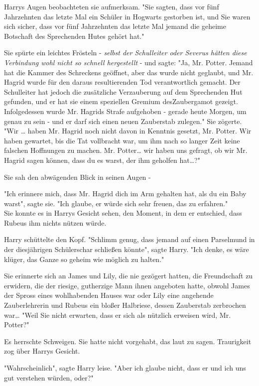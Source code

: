 {Harrys Augen beobachteten sie aufmerksam. "Sie sagten, dass vor fünf Jahrzehnten das letzte Mal ein Schüler in Hogwarts gestorben ist, und Sie waren sich sicher, dass vor fünf Jahrzehnten das letzte Mal jemand die geheime Botschaft des Sprechenden Hutes gehört hat."

Sie spürte ein leichtes Frösteln - \emph{selbst der Schulleiter oder Severus hätten diese Verbindung wohl nicht so schnell hergestellt} - und sagte: "Ja, Mr. Potter. Jemand hat die Kammer des Schreckens geöffnet, aber das wurde nicht geglaubt, und Mr. Hagrid wurde für den daraus resultierenden Tod verantwortlich gemacht. Der Schulleiter hat jedoch die zusätzliche Verzauberung auf dem Sprechenden Hut gefunden, und er hat sie einem speziellen Gremium desZaubergamot gezeigt. Infolgedessen wurde Mr. Hagrids Strafe aufgehoben - gerade heute Morgen, um genau zu sein - und er darf sich einen neuen Zauberstab zulegen." Sie zögerte. "Wir … haben Mr. Hagrid noch nicht davon in Kenntnis gesetzt, Mr. Potter. Wir haben gewartet, bis die Tat vollbracht war, um ihm nach so langer Zeit keine falschen Hoffnungen zu machen. Mr. Potter… wir haben uns gefragt, ob wir Mr. Hagrid sagen können, dass du es warst, der ihm geholfen hat…?"

Sie sah den abwägenden Blick in seinen Augen -

"Ich erinnere mich, dass Mr. Hagrid dich im Arm gehalten hat, als du ein Baby warst", sagte sie. "Ich glaube, er würde sich sehr freuen, das zu erfahren."\\ Sie konnte es in Harrys Gesicht sehen, den Moment, in dem er entschied, dass Rubeus ihm nichts nützen würde.

Harry schüttelte den Kopf. "Schlimm genug, dass jemand auf einen Parselmund in der diesjährigen Schülerschar schließen könnte", sagte Harry. "Ich denke, es wäre klüger, das Ganze so geheim wie möglich zu halten."

Sie erinnerte sich an James und Lily, die nie gezögert hatten, die Freundschaft zu erwidern, die der riesige, gutherzige Mann ihnen angeboten hatte, obwohl James der Spross eines wohlhabenden Hauses war oder Lily eine angehende Zauberlehrerin und Rubeus ein bloßer Halbriese, dessen Zauberstab zerbrochen war… "Weil Sie nicht erwarten, dass er sich als nützlich erweisen wird, Mr. Potter?"

Es herrschte Schweigen. Sie hatte nicht vorgehabt, das laut zu sagen. Traurigkeit zog über Harrys Gesicht.

"Wahrscheinlich", sagte Harry leise. "Aber ich glaube nicht, dass er und ich uns gut verstehen würden, oder?"

}
